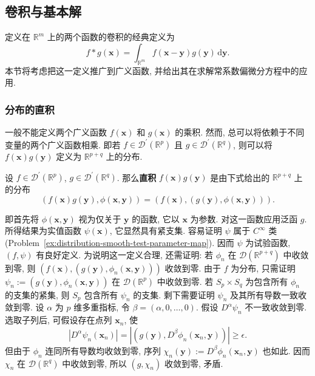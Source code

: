 \subsection{卷积与基本解}\label{sec:convolutions-fundamental-solutions}

定义在 $\mathbb{R}^m$ 上的两个函数的卷积的经典定义为
\begin{equation}\label{eq:classical-convolution-definition}
f*g(\bm{x})=\int_{\mathbb{R}^m}f(\bm{x}-\bm{y})g(\bm{y})\,\mathrm{d}\bm{y}.
\end{equation}
本节将考虑把这一定义推广到广义函数, 并给出其在求解常系数偏微分方程中的应用.

\subsubsection{分布的直积}\label{subsec:distribution-direct-product}

一般不能定义两个广义函数 $f(\bm{x})$ 和 $g(\bm{x})$ 的乘积. 然而, 总可以将依赖于不同变量的两个广义函数相乘. 即若 $f\in\mathcal{D}^{\prime}(\mathbb{R}^p)$ 且 $g\in\mathcal{D}^{\prime}(\mathbb{R}^q)$, 则可以将 $f(\bm{x})g(\bm{y})$ 定义为 $\mathbb{R}^{p+q}$ 上的分布.

\begin{Definition}
\label{def:distribution-direct-product}
设 $f\in\mathcal{D}^{\prime}(\mathbb{R}^p)$, $g\in\mathcal{D}^{\prime}(\mathbb{R}^q)$. 那么\textbf{直积} $f(\bm{x})g(\bm{y})$ 是由下式给出的 $\mathbb{R}^{p+q}$ 上的分布
\begin{equation}\label{eq:distribution-direct-product-definition}
(f(\bm{x})g(\bm{y}),\phi(\bm{x},\bm{y}))=(f(\bm{x}),(g(\bm{y}),\phi(\bm{x},\bm{y}))).
\end{equation}

\end{Definition}

即首先将 $\phi(\bm{x},\bm{y})$ 视为仅关于 $\bm{y}$ 的函数, 它以 $\bm{x}$ 为参数. 对这一函数应用泛函 $g$. 所得结果为实值函数 $\psi(\bm{x})$, 它显然具有紧支集. 容易证明 $\psi$ 属于 $C^\infty$ 类 (Problem~\ref{ex:distribution-smooth-test-parameter-map}). 因而 $\psi$ 为试验函数, $(f,\psi)$ 有良好定义. 为说明这一定义合理, 还需证明: 若 $\phi_n$ 在 $\mathcal{D}(\mathbb{R}^{p+q})$ 中收敛到零, 则 $(f(\bm{x}),(g(\bm{y}),\phi_n(\bm{x},\bm{y})))$ 收敛到零. 由于 $f$ 为分布, 只需证明 $\psi_n:=(g(\bm{y}),\phi_n(\bm{x},\bm{y}))$ 在 $\mathcal{D}(\mathbb{R}^p)$ 中收敛到零. 若 $S_p\times S_q$ 为包含所有 $\phi_n$ 的支集的紧集, 则 $S_p$ 包含所有 $\psi_n$ 的支集. 剩下需要证明 $\psi_n$ 及其所有导数一致收敛到零. 设 $\alpha$ 为 $p$ 维多重指标, 令 $\beta=(\alpha,0,\ldots,0)$. 假设 $D^\alpha\psi_n$ 不一致收敛到零. 选取子列后, 可假设存在点列 $\bm{x}_n$, 使
\begin{equation}\label{eq:direct-product-continuity-contradiction}
|D^\alpha\psi_n(\bm{x}_n)|=|(g(\bm{y}),D^\beta\phi_n(\bm{x}_n,\bm{y}))|\geq\epsilon.
\end{equation}
但由于 $\phi_n$ 连同所有导数均收敛到零, 序列 $\chi_n(\bm{y}):=D^\beta\phi_n(\bm{x}_n,\bm{y})$ 也如此. 因而 $\chi_n$ 在 $\mathcal{D}(\mathbb{R}^q)$ 中收敛到零, 所以 $(g,\chi_n)$ 收敛到零, 矛盾.

